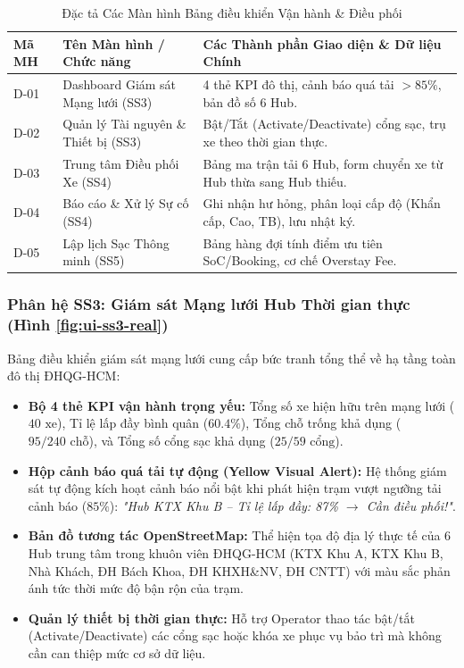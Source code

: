 \documentclass[12pt,a4paper]{article}
\begin{document}
\begin{table}[H]
    \centering
    \small
    \renewcommand{\arraystretch}{1.2}
    \caption{Đặc tả Các Màn hình Bảng điều khiển Vận hành \& Điều phối}
    \label{tab:ui-operator-screens}
    \begin{tabularx}{\textwidth}{|l|l|X|}
        \hline
        \textbf{Mã MH} & \textbf{Tên Màn hình / Chức năng} & \textbf{Các Thành phần Giao diện \& Dữ liệu Chính} \\
        \hline
        D-01 & Dashboard Giám sát Mạng lưới (SS3) & 4 thẻ KPI đô thị, cảnh báo quá tải $>85\%$, bản đồ số 6 Hub. \\
        \hline
        D-02 & Quản lý Tài nguyên \& Thiết bị (SS3) & Bật/Tắt (Activate/Deactivate) cổng sạc, trụ xe theo thời gian thực. \\
        \hline
        D-03 & Trung tâm Điều phối Xe (SS4) & Bảng ma trận tải 6 Hub, form chuyển xe từ Hub thừa sang Hub thiếu. \\
        \hline
        D-04 & Báo cáo \& Xử lý Sự cố (SS4) & Ghi nhận hư hỏng, phân loại cấp độ (Khẩn cấp, Cao, TB), lưu nhật ký. \\
        \hline
        D-05 & Lập lịch Sạc Thông minh (SS5) & Bảng hàng đợi tính điểm ưu tiên SoC/Booking, cơ chế Overstay Fee. \\
        \hline
    \end{tabularx}
\end{table}

\clearpage
\subsubsection{Phân hệ SS3: Giám sát Mạng lưới Hub Thời gian thực (Hình \ref{fig:ui-ss3-real})}
Bảng điều khiển giám sát mạng lưới cung cấp bức tranh tổng thể về hạ tầng toàn đô thị ĐHQG-HCM:
\begin{itemize}[nosep]
    \item \textbf{Bộ 4 thẻ KPI vận hành trọng yếu:} Tổng số xe hiện hữu trên mạng lưới ($40\text{ xe}$), Tỉ lệ lấp đầy bình quân ($60.4\%$), Tổng chỗ trống khả dụng ($95/240\text{ chỗ}$), và Tổng số cổng sạc khả dụng ($25/59\text{ cổng}$).
    \item \textbf{Hộp cảnh báo quá tải tự động (Yellow Visual Alert):} Hệ thống giám sát tự động kích hoạt cảnh báo nổi bật khi phát hiện trạm vượt ngưỡng tải cảnh báo ($85\%$): \textit{"Hub KTX Khu B -- Tỉ lệ lấp đầy: 87\% $\rightarrow$ Cần điều phối!"}.
    \item \textbf{Bản đồ tương tác OpenStreetMap:} Thể hiện tọa độ địa lý thực tế của 6 Hub trung tâm trong khuôn viên ĐHQG-HCM (KTX Khu A, KTX Khu B, Nhà Khách, ĐH Bách Khoa, ĐH KHXH\&NV, ĐH CNTT) với màu sắc phản ánh tức thời mức độ bận rộn của trạm.
    \item \textbf{Quản lý thiết bị thời gian thực:} Hỗ trợ Operator thao tác bật/tắt (Activate/Deactivate) các cổng sạc hoặc khóa xe phục vụ bảo trì mà không cần can thiệp mức cơ sở dữ liệu.
\end{itemize}
\end{document}
